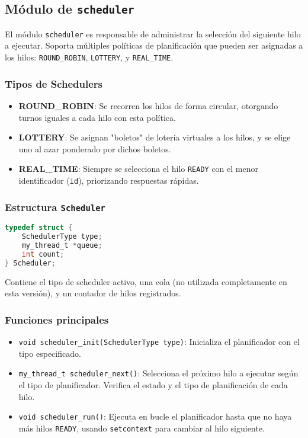 \documentclass[12pt]{article}
\begin{document}
\subsection{Módulo de \texttt{scheduler}}

El módulo \texttt{scheduler} es responsable de administrar la selección del siguiente hilo a ejecutar. Soporta múltiples políticas de planificación que pueden ser asignadas a los hilos: \texttt{ROUND\_ROBIN}, \texttt{LOTTERY}, y \texttt{REAL\_TIME}.

\subsubsection*{Tipos de Schedulers}

\begin{itemize}
    \item \textbf{ROUND\_ROBIN}: Se recorren los hilos de forma circular, otorgando turnos iguales a cada hilo con esta política.
    \item \textbf{LOTTERY}: Se asignan "boletos" de lotería virtuales a los hilos, y se elige uno al azar ponderado por dichos boletos.
    \item \textbf{REAL\_TIME}: Siempre se selecciona el hilo \texttt{READY} con el menor identificador (\texttt{id}), priorizando respuestas rápidas.
\end{itemize}

\subsubsection*{Estructura \texttt{Scheduler}}

\begin{lstlisting}[language=C]
typedef struct {
    SchedulerType type;
    my_thread_t *queue;
    int count;
} Scheduler;
\end{lstlisting}

Contiene el tipo de scheduler activo, una cola (no utilizada completamente en esta versión), y un contador de hilos registrados.

\subsubsection*{Funciones principales}

\begin{itemize}
    \item \texttt{void scheduler\_init(SchedulerType type)}: Inicializa el planificador con el tipo especificado.
    


    \item \texttt{my\_thread\_t scheduler\_next()}: Selecciona el próximo hilo a ejecutar según el tipo de planificador. Verifica el estado y el tipo de planificación de cada hilo.

    \item \texttt{void scheduler\_run()}: Ejecuta en bucle el planificador hasta que no haya más hilos \texttt{READY}, usando \texttt{setcontext} para cambiar al hilo siguiente.
\end{itemize}
\end{document}
